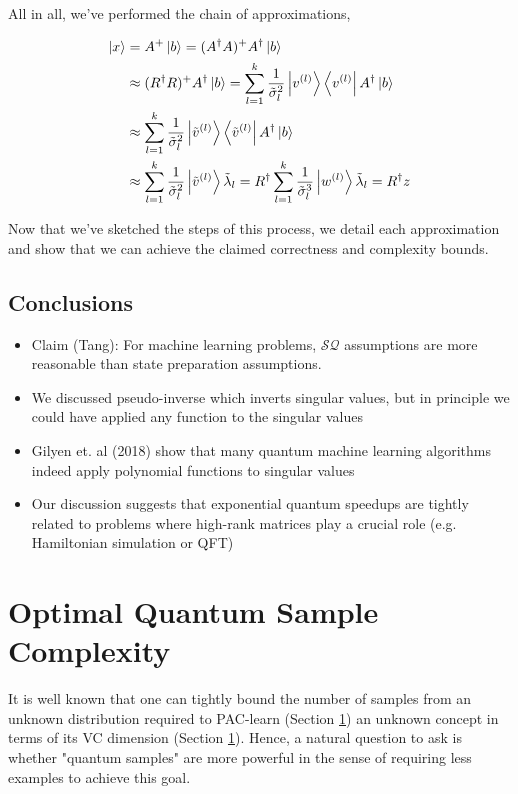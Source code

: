 \documentclass[main.tex]{subfiles}
\begin{document}
All in all, we've performed the chain of approximations,

\begin{align*}
	\ket{x} &= A^+ \ket{b} = (A^\dag A)^+ A^\dag \ket{b}\\
	&\approx (R^\dag R)^+ A^\dag \ket{b} = \sum_{l = 1}^k \frac{1}{\tilde{\sigma}_l^2} \ket{v^{(l)}} \bra{v^{(l)}} A^\dag \ket{b}\\
	&\approx \sum_{l = 1}^k \frac{1}{\tilde{\sigma}_l^2} \ket{\tilde{v}^{(l)}} \bra{\tilde{v}^{(l)}} A^\dag \ket{b}\\ %
	&\approx \sum_{l = 1}^k \frac{1}{\tilde{\sigma}_l^2} \ket{\tilde{v}^{(l)}} \tilde{\lambda}_l = R^\dag \sum_{l = 1}^k \frac{1}{\tilde{\sigma}_l^3} \ket{w^{(l)}} \tilde{\lambda}_l = R^\dag z
\end{align*}


Now that we've sketched the steps of this process, we detail each approximation and show that we can achieve the claimed correctness and complexity bounds.


\subsection{Conclusions}

\begin{itemize}
\item Claim (Tang): For machine learning problems, $\mathcal{SQ}$ assumptions are more reasonable than state preparation assumptions.
\item We discussed pseudo-inverse which inverts singular values, but in principle we could have applied any function to the singular values
\item Gilyen et. al (2018) show that many quantum machine learning algorithms indeed apply polynomial functions to singular values
\item Our discussion suggests that exponential quantum speedups are tightly related to problems where high-rank matrices play a crucial role (e.g. Hamiltonian simulation or QFT)
\end{itemize}

\section{Optimal Quantum Sample Complexity}

It is well known that one can tightly bound the number of samples from an unknown distribution required to PAC-learn (Section \ref{}) an unknown concept in terms of its VC dimension (Section \ref{}). Hence, a natural question to ask is whether "quantum samples" are more powerful in the sense of requiring less examples to achieve this goal.
\end{document}
